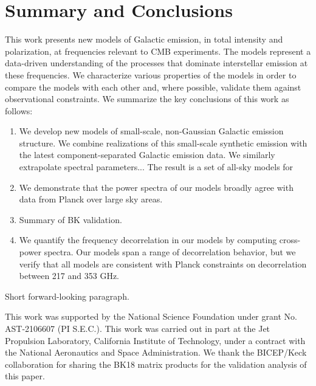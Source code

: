 \documentclass[twocolumn]{aastex631}
\begin{document}
\section{Summary and Conclusions} \label{sec:summary}

This work presents new models of Galactic emission, in total intensity and polarization, at frequencies relevant to CMB experiments. The models represent a data-driven understanding of the processes that dominate interstellar emission at these frequencies. We characterize various properties of the models in order to compare the models with each other and, where possible, validate them against observational constraints. We summarize the key conclusions of this work as follows:

\begin{enumerate}
    \item We develop new models of small-scale, non-Gaussian Galactic emission structure. We combine realizations of this small-scale synthetic emission with the latest component-separated Galactic emission data. We similarly extrapolate spectral parameters... The result is a set of all-sky models for   
    \item We demonstrate that the power spectra of our models broadly agree with data from Planck over large sky areas. 
    \item Summary of BK validation.
    \item We quantify the frequency decorrelation in our models by computing cross-power spectra. Our models span a range of decorrelation behavior, but we verify that all models are consistent with Planck constraints on decorrelation between 217 and 353 GHz. 
    
\end{enumerate}

Short forward-looking paragraph.

\begin{acknowledgments}

This work was supported by the National Science Foundation under grant No. AST-2106607 (PI S.E.C.). This work was carried out in part at the Jet Propulsion Laboratory, California Institute of Technology, under a contract with the National Aeronautics and Space Administration. We thank the BICEP/Keck collaboration for sharing the BK18 matrix products for the validation analysis of this paper. 

\end{acknowledgments}


\end{document}
